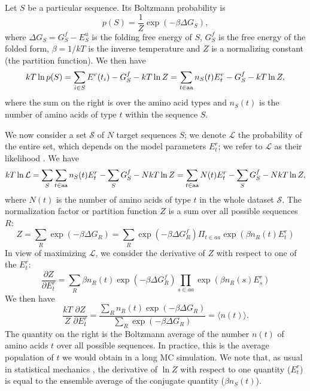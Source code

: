 \documentclass[12pt]{article}
\begin{document}
Let $S$ be a particular sequence. Its Boltzmann probability is
\begin{equation}
p(S) = \frac{1}{Z} \exp(-\beta \Delta G_S),
\end{equation}
where $\Delta G_S = G^f_S - E^u_S$ is the folding free energy of $S$, $G^f_S$ is the free energy of the folded form,
$\beta = 1/kT$ is the inverse temperature and $Z$ is a normalizing constant (the partition function). We then have
\begin{equation}
kT \ln p(S) = \sum_{i \in S} E^r(t_i)  - G^f_S - kT \ln Z = \sum_{t \in \rm aa} n_S(t) E^r_t - G^f_S - kT \ln Z,
\end{equation}
where the sum on the right is over the amino acid types and $n_S(t)$ is the number of amino acids of type $t$
within the sequence $S$.

We now consider a set ${\mathcal S}$ of $N$ target sequences $S$; we denote ${\mathcal L}$ the probability of
the entire set, which depends on the model parameters $E^r_t$; we refer to ${\mathcal L}$ as their likelihood
\cite{Kleinman06}. We have
\begin{equation}
kT \ln {\mathcal L} = \sum_S \sum_{t \in \rm aa} n_S(t) E^r_t - \sum_S G^f_S - N kT \ln Z
                    = \sum_{t \in \rm aa} N(t) E^r_t - \sum_S G^f_S - N kT \ln Z,
\end{equation}
where $N(t)$ is the number of amino acids of type $t$ in the whole dataset ${\mathcal S}$.
The normalization factor or partition function $Z$ is a sum over all possible sequences $R$:
\begin{equation}
Z = \sum_R \exp(-\beta \Delta G_R) = \sum_R \exp(-\beta \Delta G^f_R) \Pi_{t \in aa} \exp(\beta n_R(t) E^r_t)
\end{equation}
In view of maximizing ${\mathcal L}$, we consider the derivative of $Z$ with respect to one of the $E^r_t$:
\begin{equation}
\frac{ \partial Z }{ \partial E^r_t } = 
   \sum_R \beta n_R(t) \exp (-\beta \Delta G^f_R) \prod_{s \in aa} \exp(\beta n_R(s) E^r_s) 
\end{equation}
We then have
\begin{equation}
\frac{kT}{Z} \frac{ \partial Z }{ \partial E^r_t }
   = \frac{ \sum_R n_R(t) \exp(-\beta \Delta G_R) }{ \sum_R \exp(-\beta \Delta G_R) } = \langle n(t) \rangle.
\end{equation}
The quantity on the right is the Boltzmann average of the number $n(t)$ of amino acids $t$ over all possible
sequences. In practice, this is the average population of $t$ we would obtain in a long MC simulation. We note
that, as usual in statistical mechanics \cite{FowlerBK}, the derivative of $\ln Z$ with respect to one
quantity ($E^r_t$) is equal to the ensemble average of the conjugate quantity ($\beta n_S(t)$).
\end{document}
